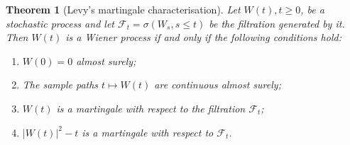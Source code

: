 \documentclass[12pt]{article}
\begin{document}
\newtheorem*{mythm}{Theorem}
\begin{mythm}[Levy's martingale characterisation]
Let $W(t), t\geq 0$, be a stochastic process and let $\mathcal{F}_t = \sigma(W_s,s\leq t)$ be the filtration generated by it. Then $W(t)$ is a Wiener process if and only if the following conditions hold:
\begin{enumerate}
\item $W(0)=0$ almost surely;
\item The sample paths $t \mapsto W(t)$ are continuous almost surely;
\item $W(t)$ is a martingale with respect to the filtration $\mathcal{F}_t$;
\item $|W(t)|^2-t$ is a martingale with respect to $\mathcal{F}_t$.
\end{enumerate}
\end{mythm}
\end{document}
